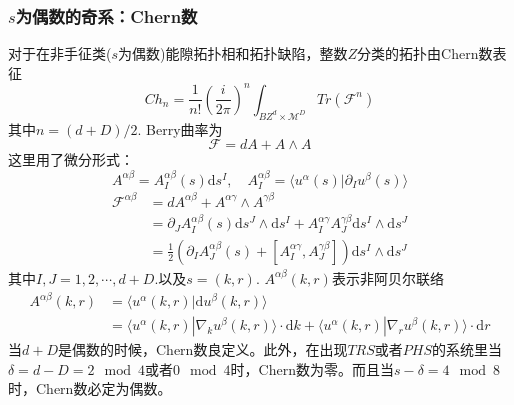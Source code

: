 \documentclass[a4paper]{article}
\numberwithin{equation}{subsection}
\begin{document}
\subsubsection{$s$为偶数的奇系：Chern数}
对于在非手征类($s$为偶数)能隙拓扑相和拓扑缺陷，整数$Z$分类的拓扑由Chern数表征
\begin{equation}
    Ch_n=\frac{1}{n!}\left(\frac{i}{2\pi}\right)^n\int_{BZ^d\times\mathcal{M}^D}Tr(\mathcal{F}^n)
\end{equation}
其中$n=(d+D)/2$. Berry曲率为
\begin{equation}
    \mathcal{F}=dA+A\wedge A
\end{equation}
这里用了微分形式：
\begin{equation}
    A^{\alpha\beta}=A_I^{\alpha\beta}(s)\mathrm{d}s^I,\quad A_I^{\alpha\beta}=\langle u^\alpha(s)|\partial_I u^\beta(s)\rangle
\end{equation}
\begin{equation}
    \begin{split}
        \mathcal{F}^{\alpha\beta}&=dA^{\alpha\beta}+A^{\alpha\gamma}\wedge A^{\gamma\beta}\\
        &=\partial_J A_I^{\alpha\beta}(s)\mathrm{d}s^J\wedge\mathrm{d}s^I+A_I^{\alpha\gamma}A_J^{\gamma\beta}\mathrm{d}s^I\wedge\mathrm{d}s^J\\
        &=\frac{1}{2}(\partial_IA_J^{\alpha\beta}(s)+[A_I^{\alpha\gamma},A_J^{\gamma\beta}])\mathrm{d}s^I\wedge \mathrm{d}s^J
    \end{split}
\end{equation}
其中$I,J=1,2,\cdots,d+D.$以及$s=(k,r)$. $A^{\alpha\beta}(k,r)$表示非阿贝尔联络
\begin{equation}
    \begin{split}
        A^{\alpha\beta}(k,r)&=\langle u^{\alpha}(k,r)|\mathrm{d}u^\beta(k,r)\rangle\\
        &=\langle u^\alpha(k,r)|\nabla_k u^\beta(k,r)\rangle\cdot \mathrm{d}k+\langle u^\alpha(k,r)|\nabla_r u^\beta(k,r)\rangle\cdot \mathrm{d}r
    \end{split}
\end{equation}
当$d+D$是偶数的时候，Chern数良定义。此外，在出现$TRS$或者$PHS$的系统里当$\delta=d-D=2\mod{4}$或者$0\mod{4}$时，Chern数为零。而且当$s-\delta=4\mod{8}$时，Chern数必定为偶数。
\end{document}
